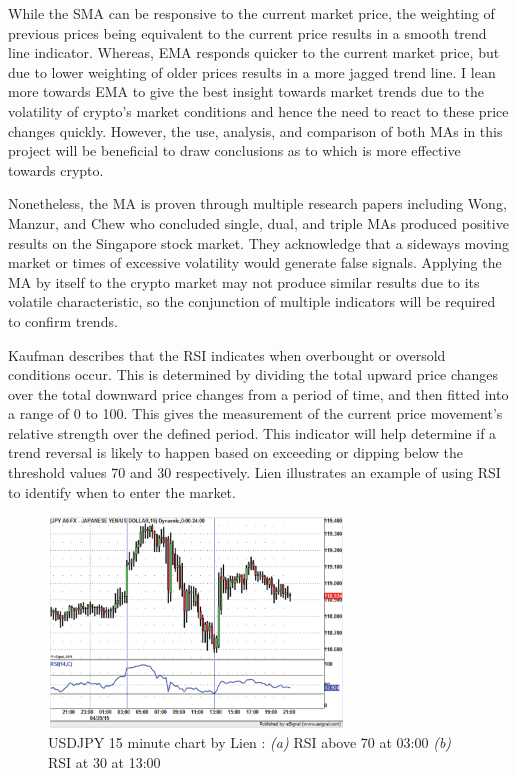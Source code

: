 While the SMA can be responsive to the current market price, the weighting of previous prices being equivalent to the current price results in a smooth trend line indicator. Whereas, EMA responds quicker to the current market price, but due to lower weighting of older prices results in a more jagged trend line. I lean more towards EMA to give the best insight towards market trends due to the volatility of crypto's market conditions and hence the need to react to these price changes quickly. However, the use, analysis, and comparison of both MAs in this project will be beneficial to draw conclusions as to which is more effective towards crypto.

Nonetheless, the MA is proven through multiple research papers including Wong, Manzur, and Chew \cite{ART:Wong:2003} who concluded single, dual, and triple MAs produced positive results on the Singapore stock market. They acknowledge that a sideways moving market or times of excessive volatility would generate false signals. Applying the MA by itself to the crypto market may not produce similar results due to its volatile characteristic, so the conjunction of multiple indicators will be required to confirm trends.  

Kaufman \cite{BOOK:Kaufman:2013} describes that the RSI indicates when overbought or oversold conditions occur. This is determined by dividing the total upward price changes over the total downward price changes from a period of time, and then fitted into a range of 0 to 100. This gives the measurement of the current price movement's relative strength over the defined period. This indicator will help determine if a trend reversal is likely to happen based on exceeding or dipping below the threshold values 70 and 30 respectively. Lien \cite{BOOK:Lien:2016} illustrates an example of using RSI to identify when to enter the market. 

\begin{figure}[htb]
    \centering
	\includegraphics[width=0.7\textwidth]{content/graphics/USDJPY-15_min_chart}
	\caption{USDJPY 15 minute chart by Lien \cite{BOOK:Lien:2016}: \textit{(a)} RSI above 70 at 03:00
	\textit{(b)} RSI at 30 at 13:00}
	\label{fig:related:USDJPY_15min}
\end{figure}

